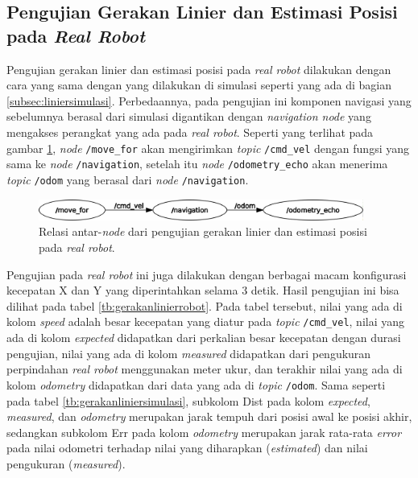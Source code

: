 \subsection{Pengujian Gerakan Linier dan Estimasi Posisi pada \emph{Real Robot}}
\label{subsec:linierrobot}

Pengujian gerakan linier dan estimasi posisi pada \emph{real robot} dilakukan dengan cara yang sama dengan yang dilakukan di simulasi seperti yang ada di bagian \ref{subsec:liniersimulasi}.
Perbedaannya, pada pengujian ini komponen navigasi yang sebelumnya berasal dari simulasi digantikan dengan \emph{navigation node} yang mengakses perangkat yang ada pada \emph{real robot}.
Seperti yang terlihat pada gambar \ref{fig:rosgraphnavigation},
  \emph{node} \lstinline{/move_for} akan mengirimkan \emph{topic} \lstinline{/cmd_vel} dengan fungsi yang sama ke \emph{node} \lstinline{/navigation},
  setelah itu \emph{node} \lstinline{/odometry_echo} akan menerima \emph{topic} \lstinline{/odom} yang berasal dari \emph{node} \lstinline{/navigation}.

\begin{figure}[ht]
  \centering
  \includegraphics[width=0.95\textwidth,keepaspectratio]{gambar/rosgraph-navigation.png}
  \caption{Relasi antar-\emph{node} dari pengujian gerakan linier dan estimasi posisi pada \emph{real robot}.}
  \label{fig:rosgraphnavigation}
\end{figure}

Pengujian pada \emph{real robot} ini juga dilakukan dengan berbagai macam konfigurasi kecepatan X dan Y yang diperintahkan selama 3 detik.
Hasil pengujian ini bisa dilihat pada tabel \ref{tb:gerakanlinierrobot}.
Pada tabel tersebut, nilai yang ada di kolom \emph{speed} adalah besar kecepatan yang diatur pada \emph{topic} \lstinline{/cmd_vel},
  nilai yang ada di kolom \emph{expected} didapatkan dari perkalian besar kecepatan dengan durasi pengujian,
  nilai yang ada di kolom \emph{measured} didapatkan dari pengukuran perpindahan \emph{real robot} menggunakan meter ukur,
  dan terakhir nilai yang ada di kolom \emph{odometry} didapatkan dari data yang ada di \emph{topic} \lstinline{/odom}.
Sama seperti pada tabel \ref{tb:gerakanliniersimulasi},
  subkolom Dist pada kolom \emph{expected}, \emph{measured}, dan \emph{odometry} merupakan jarak tempuh dari posisi awal ke posisi akhir,
  sedangkan subkolom Err pada kolom \emph{odometry} merupakan jarak rata-rata \emph{error} pada nilai odometri terhadap nilai yang diharapkan (\emph{estimated}) dan nilai pengukuran (\emph{measured}).

